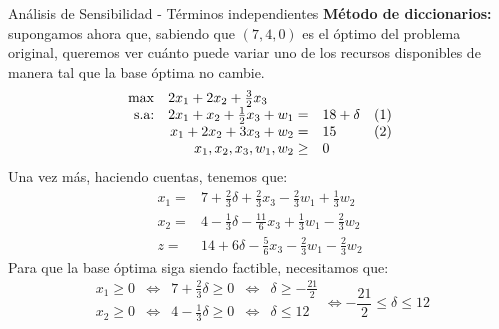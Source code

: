 \documentclass[10pt, aspectratio=169]{beamer}
\begin{document}
\begin{frame}{Análisis de Sensibilidad - Términos independientes}\small
    \textbf{Método de diccionarios:} supongamos ahora que, sabiendo que $(7,4,0)$ es el óptimo del problema original, queremos ver cuánto puede variar uno de los recursos disponibles de manera tal que la base óptima no cambie. 
        $$
    \begin{array}{rrlc}
    \max & \multicolumn{2}{l}{2x_1+2x_2+\frac{3}{2}x_3}\\
    \text{s.a:}& 2x_1+x_2+\frac{1}{2}x_3 + w_1 = & 18 + \delta & (1)\\
     & x_1+2x_2+3x_3 + w_2 = & 15 & (2)\\
     & x_1, x_2, x_3, w_1, w_2\geq & 0 \\
    \end{array}
    $$
    Una vez más, haciendo cuentas, tenemos que:
    \[\begin{array}{rl}
        x_1 = & 7+\frac{2}{3}\delta + \frac{2}{3}x_3-\frac{2}{3}w_1+\frac{1}{3}w_2 \\
        x_2 = & 4-\frac{1}{3}\delta -\frac{11}{6}x_3+\frac{1}{3}w_1-\frac{2}{3}w_2 \\\hline
        z = & 14+6\delta -\frac{5}{6}x_3-\frac{2}{3}w_1-\frac{2}{3}w_2
    \end{array}\]
    Para que la base óptima siga siendo factible, necesitamos que:\pause
    \[
    \begin{array}{lclcl}
        x_1\geq 0 & \Leftrightarrow & 7+\frac{2}{3}\delta \geq 0 & \Leftrightarrow & \delta \geq -\frac{21}{2} \\
        x_2\geq 0 & \Leftrightarrow & 4-\frac{1}{3}\delta \geq 0 & \Leftrightarrow & \delta \leq 12 \\
    \end{array}\Leftrightarrow -\frac{21}{2}\leq\delta\leq 12
    \]
\end{frame}
\end{document}
